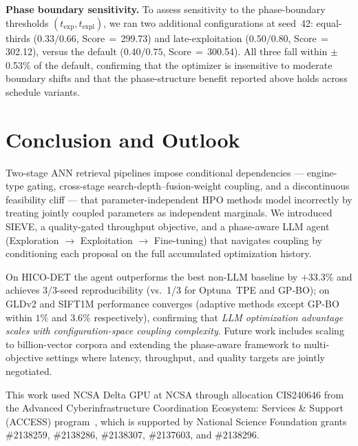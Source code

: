 \documentclass[sigconf, nonacm]{acmart}
\theoremstyle{definition}
\begin{document}
\noindent\textbf{Phase boundary sensitivity.}
To assess sensitivity to the phase-boundary thresholds $(t_{\mathrm{exp}},t_{\mathrm{expl}})$, we ran two additional configurations at seed~42: equal-thirds ($0.33/0.66$, Score\,$=$\,299.73) and late-exploitation ($0.50/0.80$, Score\,$=$\,302.12), versus the default ($0.40/0.75$, Score\,$=$\,300.54).
All three fall within $\pm$0.53\% of the default, confirming that the optimizer is insensitive to moderate boundary shifts and that the phase-structure benefit reported above holds across schedule variants.

\enlargethispage{3\baselineskip}
\vspace{3pt}
\section{Conclusion and Outlook}
\label{sec:conclusion}

Two-stage ANN retrieval pipelines impose conditional dependencies ---
engine-type gating, cross-stage search-depth--fusion-weight coupling, and a
discontinuous feasibility cliff --- that parameter-independent HPO methods
model incorrectly by treating jointly coupled parameters as independent
marginals.
We introduced SIEVE, a quality-gated throughput objective, and a phase-aware
LLM agent (Exploration $\to$ Exploitation $\to$ Fine-tuning) that navigates
coupling by conditioning each proposal on the full accumulated optimization history.

On HICO-DET the agent outperforms the best non-LLM baseline by $+33.3\%$ and achieves 3/3-seed
reproducibility (vs.\ 1/3 for Optuna~TPE and GP-BO); on GLDv2 and SIFT1M performance converges (adaptive methods except GP-BO within $1\%$ and $3.6\%$ respectively),
confirming that \emph{LLM optimization advantage scales with configuration-space coupling complexity}.
Future work includes scaling to billion-vector corpora and extending the
phase-aware framework to multi-objective settings where latency, throughput,
and quality targets are jointly negotiated.

\vspace{-4pt}
\begin{acks}
This work used NCSA Delta GPU at NCSA through allocation CIS240646 from the Advanced Cyberinfrastructure
Coordination Ecosystem: Services \& Support (ACCESS)
program~\cite{boerner2023access}, which is supported by National Science Foundation grants \#2138259, \#2138286, \#2138307, \#2137603,
and \#2138296.
\end{acks}



\end{document}
